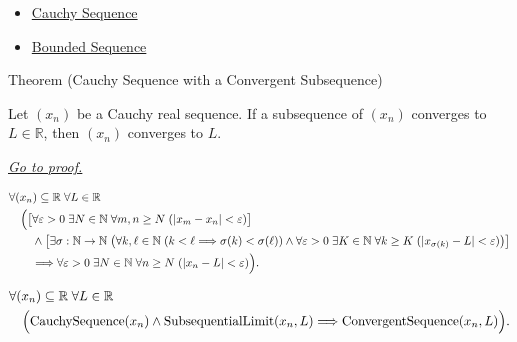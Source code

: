\begin{dependencies}
\begin{itemize}
  \item \hyperref[def:cauchy-sequence]{Cauchy Sequence}
  \item \hyperref[def:bounded-sequence]{Bounded Sequence}
\end{itemize}
\end{dependencies}


\begin{theorembox}{Theorem (Cauchy Sequence with a Convergent Subsequence)}
\begin{theorem}
\label{thm:cauchy-sequence-with-convergent-subsequence}
Let $(x_n)$ be a Cauchy real sequence. If a subsequence of $(x_n)$
converges to $L\in\mathbb{R}$, then $(x_n)$ converges to $L$.

\smallskip
\noindent
\hyperref[prf:cauchy-sequence-with-convergent-subsequence]{\textit{Go to proof.}}
\end{theorem}
\end{theorembox}

\begin{remark*}
\[
\begin{aligned}
&\forall (x_n)\subseteq\mathbb{R}\;\forall L\in\mathbb{R}\\
&\quad
\Bigl(
  \bigl[
    \forall \varepsilon>0\;\exists N\in\mathbb{N}\;\forall m,n\ge N
    \;( |x_m-x_n|<\varepsilon )
  \bigr]\\
&\qquad\land
  \bigl[
    \exists \sigma:\mathbb{N}\to\mathbb{N}\;
    \bigl(
      \forall k,\ell\in\mathbb{N}\;(k<\ell\Longrightarrow \sigma(k)<\sigma(\ell))
      \land
      \forall \varepsilon>0\;\exists K\in\mathbb{N}\;\forall k\ge K
      \;( |x_{\sigma(k)}-L|<\varepsilon )
    \bigr)
  \bigr]\\
&\qquad\Longrightarrow
  \forall \varepsilon>0\;\exists N\in\mathbb{N}\;\forall n\ge N
  \;( |x_n-L|<\varepsilon )
\Bigr).
\end{aligned}
\]
\end{remark*}

\begin{remark*}
\[
\begin{aligned}
&\forall (x_n)\subseteq\mathbb{R}\;\forall L\in\mathbb{R}\\
&\quad
\Bigl(
  \operatorname{CauchySequence}(x_n)
  \land
  \operatorname{SubsequentialLimit}(x_n,L)
  \Longrightarrow
  \operatorname{ConvergentSequence}(x_n,L)
\Bigr).
\end{aligned}
\]
\end{remark*}

